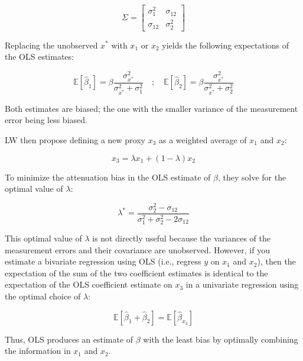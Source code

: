 \[
\Sigma = \begin{bmatrix}
    \sigma_1^2 & \sigma_{12} \\
    \sigma_{12} & \sigma_2^2
\end{bmatrix}
\]

Replacing the unobserved \(x^*\) with \(x_1\) or \(x_2\) yields the following expectations of the OLS estimates:

\[
\mathbb{E} \left[ \hat{\beta}_1 \right] = \beta \frac{\sigma_{x^*}^2}{\sigma_{x^*}^2 + \sigma_1^2} \quad ; \quad \mathbb{E} \left[ \hat{\beta}_2 \right] = \beta \frac{\sigma_{x^*}^2}{\sigma_{x^*}^2 + \sigma_2^2}
\]

Both estimates are biased; the one with the smaller variance of the measurement error being less biased.

LW then propose defining a new proxy \(x_3\) as a weighted average of \(x_1\) and \(x_2\):

\[
x_3 = \lambda x_1 + (1 - \lambda) x_2
\]

To minimize the attenuation bias in the OLS estimate of \(\beta\), they solve for the optimal value of \(\lambda\):

\[
\lambda^* = \frac{\sigma_2^2 - \sigma_{12}}{\sigma_1^2 + \sigma_2^2 - 2\sigma_{12}}
\]

This optimal value of \(\lambda\) is not directly useful because the variances of the measurement errors and their covariance are unobserved. However, if you estimate a bivariate regression using OLS (i.e., regress \(y\) on \(x_1\) and \(x_2\)), then the expectation of the sum of the two coefficient estimates is identical to the expectation of the OLS coefficient estimate on \(x_3\) in a univariate regression using the optimal choice of \(\lambda\):

\[
\mathbb{E} \left[ \hat{\beta}_1 + \hat{\beta}_2 \right] = \mathbb{E} \left[ \hat{\beta}_{x_3} \right]
\]

Thus, OLS produces an estimate of \(\beta\) with the least bias by optimally combining the information in \(x_1\) and \(x_2\).
